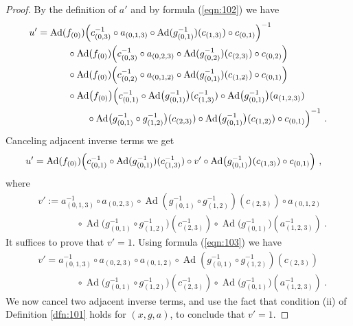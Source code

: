 \documentclass[a4paper,10pt]{amsart}
\theoremstyle{definition}
\numberwithin{equation}{section}
\newcommand{\opn}{\operatorname}
\begin{document}
\begin{proof}
By the definition of $a'$ and by formula (\ref{eqn:102}) we have
\[ \begin{aligned}
& u' = 
\opn{Ad} ( f_{(0)} )
\Bigl(  c_{(0, 3)}^{-1} \circ a_{(0, 1, 3)}
\circ \opn{Ad}(g_{(0, 1)}^{-1})(c_{(1, 3)}) \circ c_{(0, 1)} \Bigr)^{-1}
\\
& \qquad \qquad \circ
\opn{Ad} ( f_{(0)} )
\Bigl( c_{(0, 3)}^{-1}  \circ a_{(0, 2, 3)} \circ
\opn{Ad}(g_{(0, 2)}^{-1})(c_{(2, 3)}) \circ c_{(0, 2)} \Bigr)
\\
& \qquad \qquad \circ  
\opn{Ad} ( f_{(0)} )
\Bigl(  c_{(0, 2)}^{-1} \circ a_{(0, 1, 2)} \circ
\opn{Ad}(g_{(0, 1)}^{-1})(c_{(1, 2)})  \circ c_{(0, 1)} \Bigr)
\\
& \qquad \qquad \circ \opn{Ad} \bigl( f_{(0)} \bigr)
\Bigl( c_{(0, 1)}^{-1} \circ 
\opn{Ad} \bigl( g_{(0, 1)}^{-1} \bigr)(c_{(1, 3)}^{-1}) \circ
\opn{Ad} \bigl( g_{(0, 1)}^{-1} \bigr)(a_{(1, 2, 3)}) 
\\
& \qquad \qquad  \qquad \circ 
\opn{Ad} \bigl( g_{(0, 1)}^{-1} \circ g_{(1, 2)}^{-1} \bigr)(c_{(2, 3)}) \circ
\opn{Ad} \bigl( g_{(0, 1)}^{-1} \bigr)(c_{(1, 2)}) 
\circ c_{(0, 1)} \Bigr)^{-1} \ .
\end{aligned} \]
Canceling adjacent inverse terms we get
\[ \begin{aligned}
& u' = 
\opn{Ad} ( f_{(0)} ) \Bigl(  c_{(0, 1)}^{-1} \circ 
\opn{Ad}(g_{(0, 1)}^{-1})(c_{(1, 3)}^{-1}) \circ 
v' \circ
\opn{Ad} \bigl( g_{(0, 1)}^{-1} \bigr)(c_{(1, 3)})
\circ c_{(0, 1)} \Bigr) \ , 
\end{aligned} \]
where
\[ \begin{aligned}
& v' := 
a_{(0, 1, 3)}^{-1} \circ a_{(0, 2, 3)} \circ 
\opn{Ad}(g_{(0, 1)}^{-1} \circ g_{(1, 2)}^{-1})(c_{(2, 3)})
\circ a_{(0, 1, 2)} 
\\
& \qquad \qquad \circ
\opn{Ad} \bigl( g_{(0, 1)}^{-1} \circ g_{(1, 2)}^{-1} \bigr)(c_{(2, 3)}^{-1})
\circ \opn{Ad} \bigl( g_{(0, 1)}^{-1} \bigr)(a_{(1, 2, 3)}^{-1}) \ .
\end{aligned} \]
It suffices to prove that $v' = 1$. 
Using formula (\ref{eqn:103}) we have 
\[ \begin{aligned}
& v' =  a_{(0, 1, 3)}^{-1} \circ a_{(0, 2, 3)}
\circ a_{(0, 1, 2)} \circ 
\opn{Ad}(g_{(0, 1)}^{-1} \circ g_{(1, 2)}^{-1})(c_{(2, 3)})
\\
& \qquad \qquad \circ
\opn{Ad} \bigl( g_{(0, 1)}^{-1} \circ g_{(1, 2)}^{-1} \bigr)(c_{(2, 3)}^{-1})
\circ \opn{Ad} \bigl( g_{(0, 1)}^{-1} \bigr)(a_{(1, 2, 3)}^{-1}) \ .
\end{aligned} \]
We now cancel two adjacent inverse terms, and use the fact that condition
(ii) of Definition \ref{dfn:101} holds for $(x, g, a)$, to conclude that 
$v' = 1$.
\end{proof}
\end{document}
